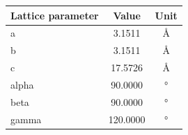 \begin{tabular}{lcc}
\toprule
Lattice parameter & Value & Unit \\
\midrule
a & 3.1511 & Å \\
b & 3.1511 & Å \\
c & 17.5726 & Å \\
alpha & 90.0000 & ° \\
beta & 90.0000 & ° \\
gamma & 120.0000 & ° \\
\bottomrule
\end{tabular}
